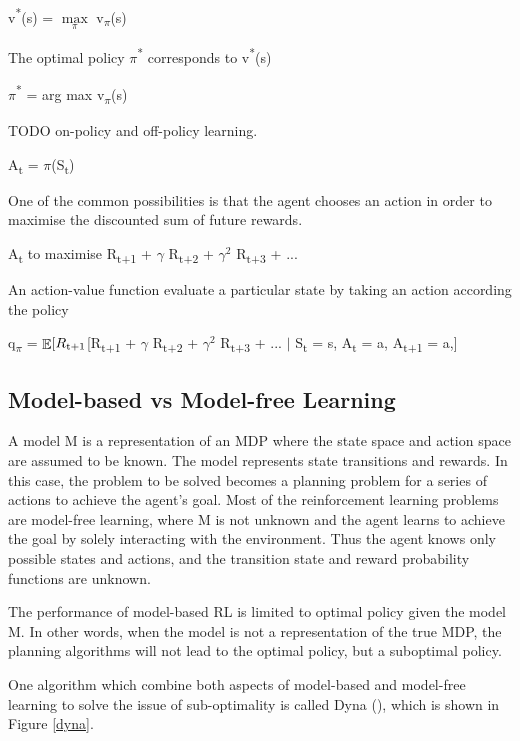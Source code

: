 \documentclass[12pt,twoside]{report}
\DeclareMathOperator{\E}{\mathbb{E}}
\begin{document}
v\textsuperscript{*}(s) = $\underset{\pi}{\max}$ v\textsubscript{$\pi$}(s)

The optimal policy $\pi$\textsuperscript{*} corresponds to v\textsuperscript{*}(s)

$\pi$\textsuperscript{*} = arg max v\textsubscript{$\pi$}(s)


TODO on-policy and off-policy learning.

A\textsubscript{t} = $\pi$(S\textsubscript{t})

One of the common possibilities is that the agent chooses an action in order to maximise the discounted sum of future rewards.

A\textsubscript{t} to maximise R\textsubscript{t+1} + $\gamma$ R\textsubscript{t+2} + $\gamma^2$ R\textsubscript{t+3} + ...

An action-value function evaluate a particular state by taking an action according the policy

q\textsubscript{$\pi$} = $\displaystyle \E[R\textsubscript{t+1} $[R\textsubscript{t+1} + $\gamma$ R\textsubscript{t+2} + $\gamma^2$ R\textsubscript{t+3} + ... $\vert$ S\textsubscript{t} = s, A\textsubscript{t} = a, A\textsubscript{t+1 } = a,]

\subsection{Model-based vs Model-free Learning}

A model M is a representation of an MDP where the state space and action space are assumed to be known. The model represents state transitions and rewards. In this case, the problem to be solved becomes a planning problem for a series of actions to achieve the agent's goal.
Most of the reinforcement learning problems are model-free learning, where M is not unknown and the agent learns to achieve the goal by solely interacting with the environment. Thus the agent knows only possible states and actions, and the transition state and reward probability functions are unknown.

The performance of model-based RL is limited to optimal policy given the model M. In other words, when the model is not a representation of the true MDP, the planning algorithms will not lead to the optimal policy, but a suboptimal policy.

One algorithm which combine both aspects of model-based and model-free learning to solve the issue of sub-optimality is called Dyna (\cite{Sutton1990}), which is shown in Figure \ref{dyna}.
\end{document}
